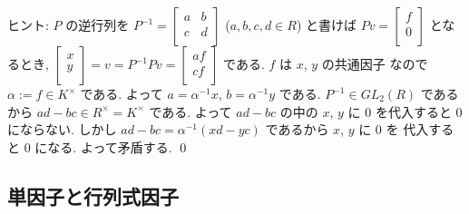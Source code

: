 \documentclass[12pt,twoside]{jarticle}
\begin{document}
\noindent
ヒント: $P$ の逆行列を $P^{-1}=
\begin{bmatrix}
  a & b \\
  c & d \\
\end{bmatrix}$  ($a,b,c,d\in R$) と書けば $Pv=
\begin{bmatrix}
  f \\
  0 \\
\end{bmatrix}$ となるとき, $
\begin{bmatrix}
  x \\
  y \\
\end{bmatrix} 
= v = P^{-1}Pv =
\begin{bmatrix}
  af \\
  cf \\
\end{bmatrix}$ である.  $f$ は $x$, $y$ の共通因子
なので $\alpha:=f\in K^\times$ である.  
よって $a=\alpha^{-1}x$, $b=\alpha^{-1}y$ である.
$P^{-1}\in GL_2(R)$ であるから $ad-bc\in R^\times=K^\times$ である.
よって $ad-bc$ の中の $x$, $y$ に $0$ を代入すると $0$ にならない.
しかし $ad - bc = \alpha^{-1}(xd - yc)$ であるから $x$, $y$ に $0$ を
代入すると $0$ になる.  よって矛盾する. \qed


\subsection{単因子と行列式因子}
\label{sec:elementary-divisor}
\end{document}
